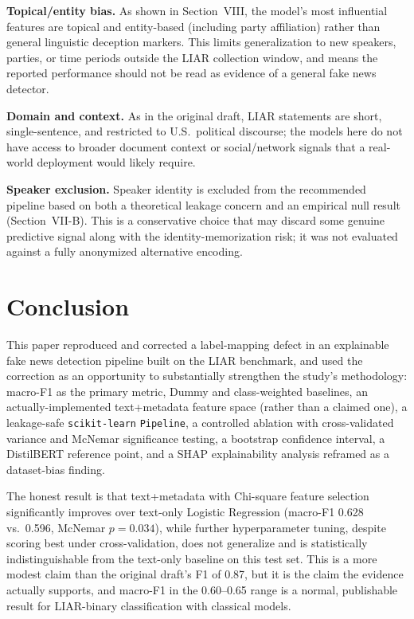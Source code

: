 \documentclass[conference]{IEEEtran}
\begin{document}
\textbf{Topical/entity bias.} As shown in Section~VIII, the model's most
influential features are topical and entity-based (including party affiliation)
rather than general linguistic deception markers. This limits generalization to
new speakers, parties, or time periods outside the LIAR collection window, and
means the reported performance should not be read as evidence of a general fake
news detector.

\textbf{Domain and context.} As in the original draft, LIAR statements are short,
single-sentence, and restricted to U.S.\ political discourse; the models here do
not have access to broader document context or social/network signals that a
real-world deployment would likely require.

\textbf{Speaker exclusion.} Speaker identity is excluded from the recommended
pipeline based on both a theoretical leakage concern and an empirical null result
(Section~VII-B). This is a conservative choice that may discard some genuine
predictive signal along with the identity-memorization risk; it was not evaluated
against a fully anonymized alternative encoding.

\section{Conclusion}
This paper reproduced and corrected a label-mapping defect in an explainable fake
news detection pipeline built on the LIAR benchmark, and used the correction as an
opportunity to substantially strengthen the study's methodology: macro-F1 as the
primary metric, Dummy and class-weighted baselines, an actually-implemented
text+metadata feature space (rather than a claimed one), a leakage-safe
\texttt{scikit-learn} \texttt{Pipeline}, a controlled ablation with
cross-validated variance and McNemar significance testing, a bootstrap confidence
interval, a DistilBERT reference point, and a SHAP explainability analysis
reframed as a dataset-bias finding.

The honest result is that text+metadata with Chi-square feature selection
significantly improves over text-only Logistic Regression (macro-F1 0.628 vs.\
0.596, McNemar $p=0.034$), while further hyperparameter tuning, despite scoring
best under cross-validation, does not generalize and is statistically
indistinguishable from the text-only baseline on this test set. This is a more
modest claim than the original draft's F1 of 0.87, but it is the claim the
evidence actually supports, and macro-F1 in the 0.60--0.65 range is a normal,
publishable result for LIAR-binary classification with classical models.
\end{document}
